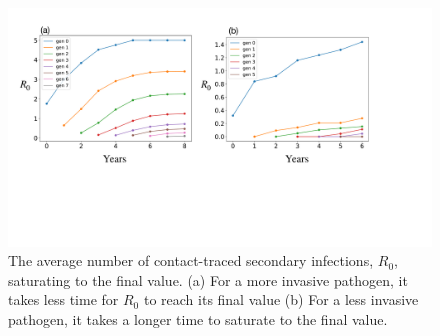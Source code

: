 \begin{figure}
    \centering
    \includegraphics[scale=0.25]{appendix/figures/A-ch6-R0-saturation-with-beta.pdf}
    \caption{The average number of contact-traced secondary infections, $R_0$, saturating to the final value. (a) For a more invasive pathogen, it takes less time for $R_0$ to reach its final value (b) For a less invasive pathogen, it takes a longer time to saturate to the final value.}
    \label{fig:a-R0-saturate}
\end{figure}




